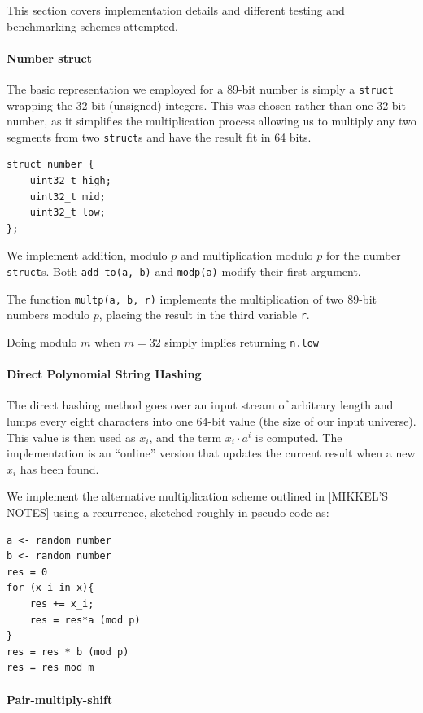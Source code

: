 \documentclass[]{article}
\newcommand{\funk}[1]{\small\texttt{#1}}
\begin{document}
This section covers implementation details and different testing and benchmarking schemes attempted.

\paragraph{Number struct}

The basic representation we employed for a 89-bit number is simply a \funk{struct} wrapping the 32-bit (unsigned) integers. This was chosen rather than one 32 bit number, as it simplifies the multiplication process allowing us to multiply any two segments from two \funk{struct}s and have the result fit in 64 bits.

\begin{verbatim}
struct number {
    uint32_t high;
    uint32_t mid;
    uint32_t low;
};
\end{verbatim}

We implement addition, modulo $p$ and multiplication modulo $p$ for the number \funk{struct}s. Both \funk{add\_to(a, b)} and \funk{modp(a)} modify their first argument.

The function \funk{multp(a, b, r)} implements the multiplication of two 89-bit numbers modulo $p$, placing the result in the third variable \funk{r}.

Doing modulo $m$ when $m = 32$ simply implies returning \funk{n.low}

\paragraph{Direct Polynomial String Hashing}

The direct hashing method goes over an input stream of arbitrary length and lumps every eight characters into one 64-bit value (the size of our input universe). This value is then used as $x_i$, and the term $x_i\cdot a^i$ is computed. The implementation is an ``online'' version that updates the current result when a new $x_i$ has been found.

We implement the alternative multiplication scheme outlined in [MIKKEL'S NOTES] using a recurrence, sketched roughly in pseudo-code as:	

\begin{verbatim}
a <- random number
b <- random number
res = 0
for (x_i in x){
    res += x_i;
    res = res*a (mod p)
}
res = res * b (mod p)
res = res mod m
\end{verbatim}

\paragraph{Pair-multiply-shift} 
\end{document}
